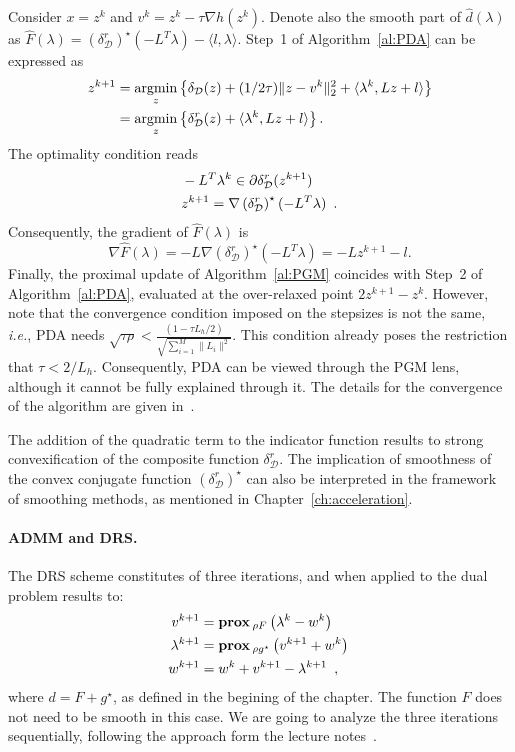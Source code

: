 \documentclass[openany]{now}
\newcommand{\ie}{{\it i.e.}}
\newcommand{\argmin}{\mathop{\rm argmin}}
\newcommand{\prox}{\mathop{\bf prox}}
\begin{document}
Consider $x=z^k$ and $v^k=z^k-\tau\nabla h(z^k)$. Denote also the smooth part of $\hat{d}(\lambda)$ as $\hat{F}(\lambda)=\left(\delta_\mathcal{D}^r\right)^\star(-L^T\lambda)-\langle l,\lambda\rangle$. Step~1 of Algorithm~\ref{al:PDA} can be expressed as
\begin{align*}
 z^{k+1} &= \underset{z}{\argmin}\left\{\delta_\mathcal{D}(z) + (1/2\tau)\|z-v^k\|_2^2 + \langle\lambda^k,Lz+l\rangle\right\}\\
         &=\underset{z}{\argmin}\left\{\delta_\mathcal{D}^r(z)+ \langle\lambda^k,Lz+l\rangle\right\}.
\end{align*}
The optimality condition reads
\begin{align}
 \nonumber& -L^T\lambda^k \in \partial \delta_\mathcal{D}^r(z^{k+1}) \\
 \nonumber &z^{k+1} = \nabla\left(\delta_\mathcal{D}^r\right)^\star(-L^T\lambda){\label{App::eq:optCondPDA}}\enspace.
\end{align}
Consequently, the gradient of $\hat{F}(\lambda)$ is 
\[
 \nabla \hat{F}(\lambda) = -L\nabla\left(\delta_\mathcal{D}^r\right)^\star(-L^T\lambda)=-Lz^{k+1}-l.
\]
Finally, the proximal update of Algorithm~\ref{al:PGM} coincides with Step~2 of Algorithm~\ref{al:PDA}, evaluated at the over-relaxed point $2z^{k+1}-z^k$. However, note that the convergence condition imposed on the stepsizes is not the same, \ie, PDA needs $\sqrt{\tau\rho}<\frac{(1-\tau L_h/2)}{\sqrt{\sum_{i=1}^{M}\|L_i\|^2}}$. This condition already poses the restriction that $\tau<2/L_h$. Consequently, PDA can be viewed through the PGM lens, although it cannot be fully explained through it. The details for the convergence of the algorithm are given in~\cite{condat2011primal}.

\begin{remark}
 The addition of the quadratic term to the indicator function results to strong convexification of the composite function $\delta_\mathcal{D}^r$. The implication of smoothness of the convex conjugate function $\left(\delta_\mathcal{D}^r\right)^\star$ can also be interpreted in the framework of smoothing methods, as mentioned in Chapter~\ref{ch:acceleration}.
\end{remark}

\paragraph{ADMM and DRS.}
The DRS scheme constitutes of three iterations, and when applied to the dual problem results to:
 \begin{align}
 v^{k+1}       &=  \prox{_{\rho F}}\left(\lambda^k-w^k\right){\label{DRS_1}}\\
 \lambda^{k+1} &=  \prox{_{\rho g^\star}}\left(v^{k+1}+w^k\right){\label{DRS_2}}\\
 w^{k+1}       &=  w^k+v^{k+1}-\lambda^{k+1}{\label{DRS_3}}\enspace,
\end{align}
where $d=F+g^\star$, as defined in the begining of the chapter. The function $F$ does not need to be smooth in this case.
We are going to analyze the three iterations sequentially, following the approach form the lecture notes~\cite{EE_236C}.
\end{document}
